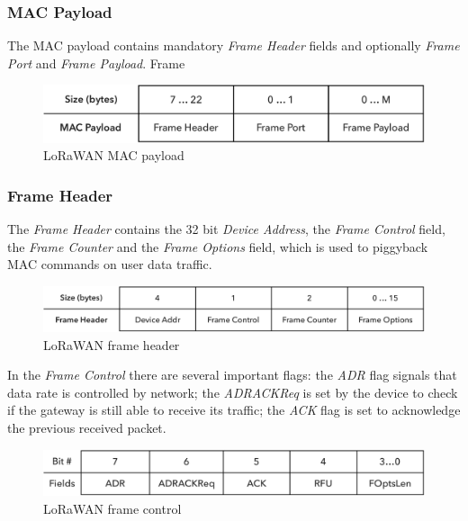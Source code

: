 \subsubsection{MAC Payload}
The MAC payload contains mandatory \emph{Frame Header} fields and optionally \emph{Frame Port} and \emph{Frame Payload}. Frame


\begin{figure}[h!]
\centering
\includegraphics[width=\textwidth]{img/msgformat/mac_payload}
\caption{LoRaWAN MAC payload}
\end{figure}


\subsubsection{Frame Header}
The \emph{Frame Header} contains the 32 bit \emph{Device Address}, the \emph{Frame Control} field, the \emph{Frame Counter} and the \emph{Frame Options} field, which is used to piggyback MAC commands on user data traffic.

\begin{figure}[h!]
\centering
\includegraphics[width=\textwidth]{img/msgformat/frame_header}
\caption{LoRaWAN frame header}
\end{figure}

In the \emph{Frame Control} there are several important flags: the \emph{ADR} flag signals that data rate is controlled by network; the \emph{ADRACKReq} is set by the device to check if the gateway is still able to receive its traffic; the \emph{ACK} flag is set to acknowledge the previous received packet.

\begin{figure}[h!]
\centering
\includegraphics[width=\textwidth]{img/msgformat/frame_control}
\caption{LoRaWAN frame control}
\end{figure}


